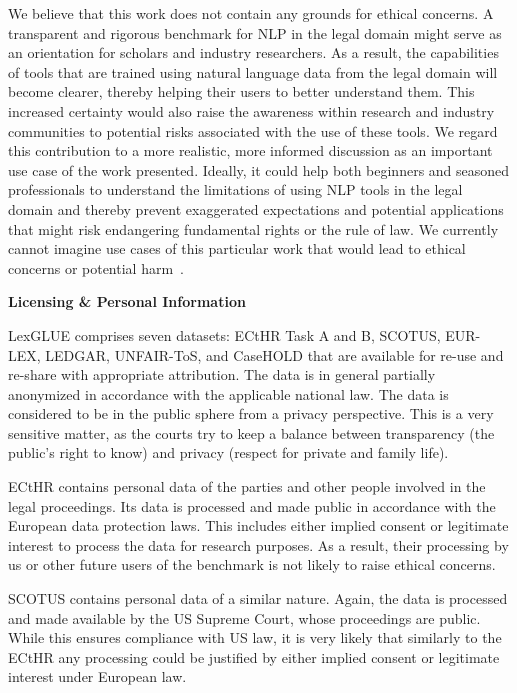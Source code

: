 \documentclass[11pt]{article}
\begin{document}
\noindent We believe that this work does not contain any grounds for ethical concerns. A transparent and rigorous benchmark for NLP in the legal domain might serve as an orientation for scholars and industry researchers. As a result, the capabilities of tools that are trained using natural language data from the legal domain will become clearer, thereby helping their users to better understand them. This increased certainty would also raise the awareness within research and industry communities to potential risks associated with the use of these tools. We regard this contribution to a more realistic, more informed discussion as an important use case of the work presented. Ideally, it could help both beginners and seasoned professionals to understand the limitations of using NLP tools in the legal domain and thereby prevent exaggerated expectations and potential applications that might risk endangering fundamental rights or the rule of law. 
We currently cannot imagine use cases of this particular work that would lead to ethical concerns or potential harm~\cite{tsarapatsanis-aletras-2021-ethical}.\vspace{2mm}

\noindent\textbf{Licensing \& Personal Information}\vspace{1mm}

\noindent LexGLUE comprises seven datasets: ECtHR Task A and B, SCOTUS, EUR-LEX, LEDGAR, UNFAIR-ToS, and CaseHOLD that are available for re-use and re-share with  appropriate attribution. The data is in general partially anonymized in accordance with the applicable national law. The data is considered to be in the public sphere from a privacy perspective. This is a very sensitive matter, as the courts try to keep a balance between transparency (the public's right to know) and privacy (respect for private and family life).

ECtHR contains personal data of the parties and other people involved in the legal proceedings. Its data is processed and made public in accordance with the European data protection laws. This includes either implied consent or legitimate interest to process the data for research purposes. As a result, their processing by us or other future users of the benchmark is not likely to raise ethical concerns. 

SCOTUS contains personal data of a similar nature. Again, the data is processed and made available by the US Supreme Court, whose proceedings are public. While this ensures compliance with US law, it is very likely that similarly to the ECtHR any processing could be justified by either implied consent or legitimate interest under European law. 
\end{document}
